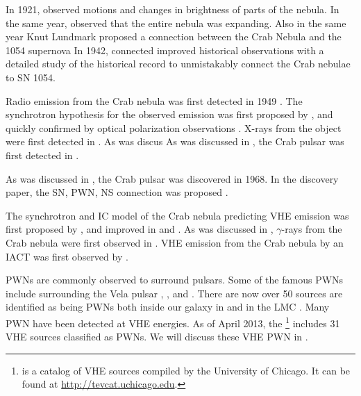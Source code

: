 In 1921, \cite{lampland_1921a_observed-changes} 
observed motions and changes in brightness of parts of the nebula.
In the same year, \cite{duncan_1921a_changes-observed} observed
that the entire nebula was expanding. Also in the same year
Knut Lundmark proposed a connection between the Crab Nebula
and the 1054 supernova \citep{lundmark_1921a_suspected-stars}
In 1942, \cite{mayall_1942a_further-bearing} connected improved
historical observations with a detailed study of the historical record
to unmistakably connect the Crab nebulae to SN 1054.

Radio emission from the Crab nebula was first detected
in 1949 \citep{bolton_1949a_positions-three}.  The
synchrotron hypothesis for the observed emission was
first proposed by \cite{shklovskii_1953a_nature-nebulas},
and quickly confirmed by optical polarization observations
\citep{dombrovsky_1954a_nature-radiation}.  X-rays from the object were
first detected in \cite{bowyer_1964a_lunar-occultation}.  As was discus
As was discussed in , the Crab pulsar
was first detected in \cite{browning_1971_detection-pulsed}.

As was discussed in , the Crab pulsar
was discovered in 1968.  In the discovery paper, the \ac{SN}, \ac{PWN},
\ac{NS} connection was proposed \citep{staelin_1968_pulsating-radio}.

The synchrotron and \ac{IC} model of the Crab nebula predicting \ac{VHE}
emission was first proposed by \cite{gould_1965a_energy-cosmic},
and improved in \cite{rieke_1969a_production-cosmic} and
\cite{grindlay_1971a_compton-synchrotron-spectrum}.  As was discussed
in , $\gamma$-rays from the Crab
nebula were first observed in \cite{nolan_1993a_observations-pulsar}.
\ac{VHE} emission from the Crab nebula by an \ac{IACT} was first observed
by \cite{weekes_1989a_observation-gamma}.

\acp{PWN} are commonly observed to surround pulsars.
Some of the famous \acp{PWN} include \velax surrounding the Vela
pulsar \citep[first observed in][]{rishbeth_1958a_radio-emission},
\threecfiftyeight \citep{slane_2004a_constraints-structure},
and \mshfifteenfiftytwo \citep{seward_1982a_x-ray-pulsar}.
There are now over 50 sources are identified as being \acp{PWN}
both inside our galaxy in and in the \ac{LMC}
\cite{kaspi_2006_isolated-neutron}.
Many \ac{PWN} have been detected at \ac{VHE} energies.
As of April 2013, the \tevcat\footnote{\tevcat 
is a catalog of \ac{VHE} sources compiled by the University of
Chicago. It can be found at \url{http://tevcat.uchicago.edu}.} 
includes 31 \ac{VHE} sources classified as \acp{PWN}.
We will discuss these \ac{VHE} \ac{PWN} in .
